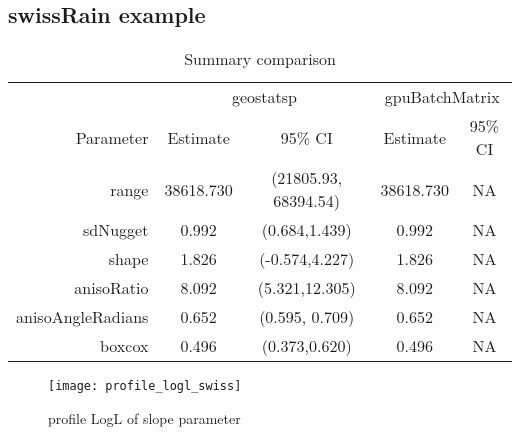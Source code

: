 \documentclass{article}\usepackage[]{graphicx}\usepackage[]{color}
\newenvironment{knitrout}{}{} %
\def\T{{\footnotesize {^{_{\sf T}}}}}
\begin{document}
% 






\subsection{swissRain example}


\begin{knitrout}
\color{fgcolor}\begin{table}[H]

\caption{\label{tab:swisssummarycompare}Summary comparison}
\centering
\begin{tabular}[t]{rcccc}
\toprule
\multicolumn{1}{c}{ } & \multicolumn{2}{c}{geostatsp} & \multicolumn{2}{c}{gpuBatchMatrix} \\
\cmidrule(l{3pt}r{3pt}){2-3} \cmidrule(l{3pt}r{3pt}){4-5}
Parameter & Estimate & 95\% CI & Estimate & 95\% CI\\
\midrule
range & 38618.730 & (21805.93, 68394.54) & 38618.730 & NA\\
sdNugget & 0.992 & (0.684,1.439) & 0.992 & NA\\
shape & 1.826 & (-0.574,4.227) & 1.826 & NA\\
anisoRatio & 8.092 & (5.321,12.305) & 8.092 & NA\\
anisoAngleRadians & 0.652 & (0.595, 0.709) & 0.652 & NA\\
boxcox & 0.496 & (0.373,0.620) & 0.496 & NA\\
\bottomrule
\end{tabular}
\end{table}

\end{knitrout}

\begin{knitrout}
\color{fgcolor}\begin{figure}[H]

{\centering \texttt{[image: profile\_logl\_swiss]} 

}

\caption[profile LogL of slope parameter]{profile LogL of slope parameter}\label{fig:swiss_profile_many}
\end{figure}

\end{knitrout}
\end{document}

